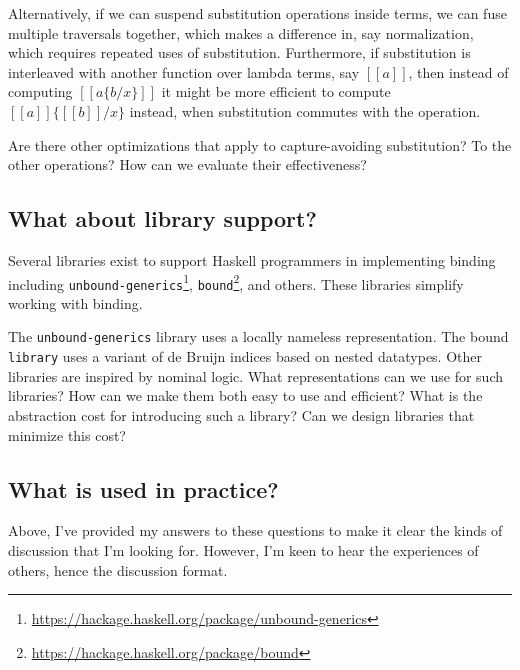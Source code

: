 \documentclass[sigplan]{acmart}
\begin{document}
Alternatively, if we can suspend substitution operations inside terms, we can
fuse multiple traversals together, which makes a difference in, say
normalization, which requires repeated uses of substitution. Furthermore, if
substitution is interleaved with another function over lambda terms, say
$[\![a]\!]$, then instead of computing $[\![a \{b/x\} ]\!]$ it might be more
efficient to compute $[\![a ]\!]\{[\![b]\!]/x\}$ instead, when substitution
commutes with the operation.

Are there other optimizations that apply to capture-avoiding substitution? To
the other operations? How can we evaluate their effectiveness?

\subsection{What about library support?}

Several libraries exist to support Haskell programmers in implementing binding
including
\texttt{unbound-generics}\footnote{\url{https://hackage.haskell.org/package/unbound-generics}},
\texttt{bound}\footnote{\url{https://hackage.haskell.org/package/bound}}, and
others. These libraries simplify working with binding.

% 
%

The \texttt{unbound-generics} library uses a locally nameless
representation. The bound \texttt{library} uses a variant of de Bruijn indices
based on nested datatypes. Other libraries are inspired by nominal logic. What
representations can we use for such libraries? How can we make them both easy
to use and efficient? What is the abstraction cost for introducing such a 
library? Can we design libraries that minimize this cost?

\subsection{What is used in practice?}

Above, I've provided my answers to these questions to make it clear the kinds
of discussion that I'm looking for. However, I'm keen to hear the experiences
of others, hence the discussion format.
\end{document}
